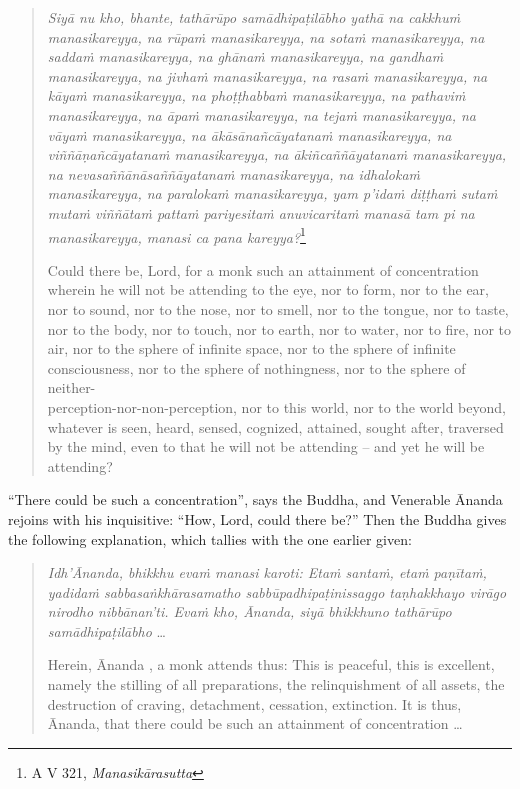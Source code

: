 \begin{quote}
\emph{Siyā nu kho, bhante, tathārūpo samādhipaṭilābho yathā na cakkhuṁ manasikareyya, na rūpaṁ manasikareyya, na sotaṁ manasikareyya, na saddaṁ manasikareyya, na ghānaṁ manasikareyya, na gandhaṁ manasikareyya, na jivhaṁ manasikareyya, na rasaṁ manasikareyya, na kāyaṁ manasikareyya, na phoṭṭhabbaṁ manasikareyya, na pathaviṁ manasikareyya, na āpaṁ manasikareyya, na tejaṁ manasikareyya, na vāyaṁ manasikareyya, na ākāsānañcāyatanaṁ manasikareyya, na viññāṇañcāyatanaṁ manasikareyya, na ākiñcaññāyatanaṁ manasikareyya, na nevasaññānāsaññāyatanaṁ manasikareyya, na idhalokaṁ manasikareyya, na paralokaṁ manasikareyya, yam p'idaṁ diṭṭhaṁ sutaṁ mutaṁ viññātaṁ pattaṁ pariyesitaṁ anuvicaritaṁ manasā tam pi na manasikareyya, manasi ca pana kareyya?}\footnote{A V 321, \emph{Manasikārasutta}}

Could there be, Lord, for a monk such an attainment of concentration wherein he will not be attending to the eye, nor to form, nor to the ear, nor to sound, nor to the nose, nor to smell, nor to the tongue, nor to taste, nor to the body, nor to touch, nor to earth, nor to water, nor to fire, nor to air, nor to the sphere of infinite space, nor to the sphere of infinite consciousness, nor to the sphere of nothingness, nor to the sphere of neither-\\ perception-nor-non-perception, nor to this world, nor to the world beyond, whatever is seen, heard, sensed, cognized, attained, sought after, traversed by the mind, even to that he will not be attending -- and yet he will be attending?
\end{quote}

``There could be such a concentration'', says the Buddha, and Venerable Ānanda rejoins with his inquisitive: ``How, Lord, could there be?'' Then the Buddha gives the following explanation, which tallies with the one earlier given:

\begin{quote}
\emph{Idh'Ānanda, bhikkhu evaṁ manasi karoti: Etaṁ santaṁ, etaṁ paṇītaṁ, yadidaṁ sabbasaṅkhārasamatho sabbūpadhipaṭinissaggo taṇhakkhayo virāgo nirodho nibbānan'ti. Evaṁ kho, Ānanda, siyā bhikkhuno tathārūpo samādhipaṭilābho} \ldots{}

Herein, Ānanda , a monk attends thus: This is peaceful, this is excellent, namely the stilling of all preparations, the relinquishment of all assets, the destruction of craving, detachment, cessation, extinction. It is thus, Ānanda, that there could be such an attainment of concentration \ldots{}
\end{quote}

